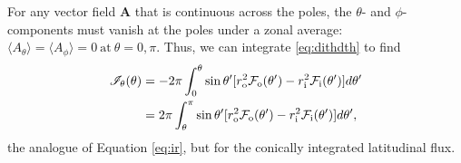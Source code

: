 \documentclass[12pt]{article} %
\newcommand{\av}[1]{\langle#1\rangle}
\newcommand{\f}{\mathcal{F}}
\newcommand{\ri}{r_{\rm{i}}}
\newcommand{\ro}{r_{\rm{o}}}
\begin{document}
For any vector field $\bm{A}$ that is continuous across the poles, the $\theta$- and $\phi$-components must vanish at the poles under a zonal average: $\av{A_\theta}=\av{A_\phi}=0\ \text{at}\ \theta=0,\pi$. Thus, we can integrate \eqref{eq:dithdth} to find
\begin{align}
\mathscr{I}_\theta(\theta) &= -2\pi\int_0^\theta\sin\theta^\prime[\ro^2\f_{\rm{o}}(\theta^\prime) - \ri^2\f_{\rm{i}}(\theta^\prime)]d\theta^\prime\nonumber\\
&= 2\pi\int_\theta^\pi\sin\theta^\prime[\ro^2\f_{\rm{o}}(\theta^\prime) - \ri^2\f_{\rm{i}}(\theta^\prime)]d\theta^\prime,
\label{eq:ith}
\end{align}
the analogue of Equation \eqref{eq:ir}, but for the conically integrated latitudinal flux. 
\end{document}

